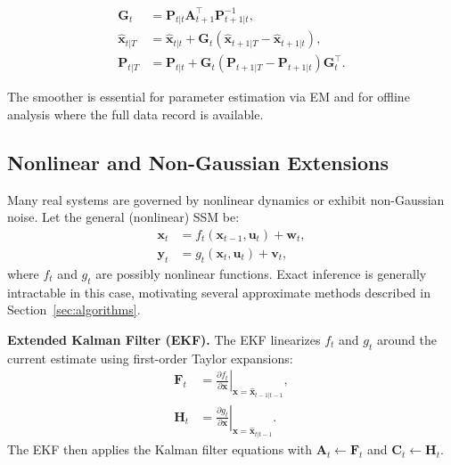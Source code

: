 \documentclass[conference]{IEEEtran}
\begin{document}
\begin{align}
\mathbf{G}_t &= \mathbf{P}_{t|t} \mathbf{A}_{t+1}^\top \mathbf{P}_{t+1|t}^{-1}, \label{eq:smoother_gain}\\
\hat{\mathbf{x}}_{t|T} &= \hat{\mathbf{x}}_{t|t} + \mathbf{G}_t (\hat{\mathbf{x}}_{t+1|T} - \hat{\mathbf{x}}_{t+1|t}), \label{eq:smoother_mean}\\
\mathbf{P}_{t|T} &= \mathbf{P}_{t|t} + \mathbf{G}_t (\mathbf{P}_{t+1|T} - \mathbf{P}_{t+1|t}) \mathbf{G}_t^\top. \label{eq:smoother_cov}
\end{align}

The smoother is essential for parameter estimation via EM and for offline analysis where the full data record is available.

\subsection{Nonlinear and Non-Gaussian Extensions}

Many real systems are governed by nonlinear dynamics or exhibit non-Gaussian noise. Let the general (nonlinear) SSM be:
\begin{align}
\mathbf{x}_t &= f_t(\mathbf{x}_{t-1}, \mathbf{u}_t) + \mathbf{w}_t, \\
\mathbf{y}_t &= g_t(\mathbf{x}_t, \mathbf{u}_t) + \mathbf{v}_t,
\end{align}
where $f_t$ and $g_t$ are possibly nonlinear functions. Exact inference is generally intractable in this case, motivating several approximate methods described in Section~\ref{sec:algorithms}.

\textbf{Extended Kalman Filter (EKF).} The EKF \cite{jazwinski1970stochastic} linearizes $f_t$ and $g_t$ around the current estimate using first-order Taylor expansions:
\begin{align}
\mathbf{F}_t &= \left.\frac{\partial f_t}{\partial \mathbf{x}}\right|_{\mathbf{x} = \hat{\mathbf{x}}_{t-1|t-1}}, \\
\mathbf{H}_t &= \left.\frac{\partial g_t}{\partial \mathbf{x}}\right|_{\mathbf{x} = \hat{\mathbf{x}}_{t|t-1}}.
\end{align}
The EKF then applies the Kalman filter equations with $\mathbf{A}_t \leftarrow \mathbf{F}_t$ and $\mathbf{C}_t \leftarrow \mathbf{H}_t$.
\end{document}
